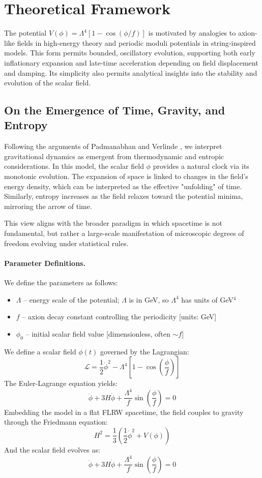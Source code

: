 \documentclass[12pt]{article}
\begin{document}
\section{Theoretical Framework}

The potential \( V(\phi) = \Lambda^4 [1 - \cos(\phi/f)] \) is motivated by analogies to axion-like fields in high-energy theory and periodic moduli potentials in string-inspired models. This form permits bounded, oscillatory evolution, supporting both early inflationary expansion and late-time acceleration depending on field displacement and damping. Its simplicity also permits analytical insights into the stability and evolution of the scalar field.

\subsection*{On the Emergence of Time, Gravity, and Entropy}

Following the arguments of Padmanabhan \cite{Padmanabhan2010} and Verlinde \cite{Verlinde2011}, we interpret gravitational dynamics as emergent from thermodynamic and entropic considerations. In this model, the scalar field $\phi$ provides a natural clock via its monotonic evolution. The expansion of space is linked to changes in the field’s energy density, which can be interpreted as the effective "unfolding" of time. Similarly, entropy increases as the field relaxes toward the potential minima, mirroring the arrow of time.

This view aligns with the broader paradigm in which spacetime is not fundamental, but rather a large-scale manifestation of microscopic degrees of freedom evolving under statistical rules.


\paragraph{Parameter Definitions.} 
We define the parameters as follows:
\begin{itemize}
  \item $\Lambda$ – energy scale of the potential; $\Lambda$ is in GeV, so $\Lambda^4$ has units of GeV$^4$
  \item $f$ – axion decay constant controlling the periodicity [units: GeV]
  \item $\phi_0$ – initial scalar field value [dimensionless, often $\sim f$]
\end{itemize}

We define a scalar field $\phi(t)$ governed by the Lagrangian:
\[
\mathcal{L} = \frac{1}{2} \dot{\phi}^2 - \Lambda^4 \left[1 - \cos\left(\frac{\phi}{f}\right)\right]
\]
The Euler-Lagrange equation yields:
\[
\ddot{\phi} + 3H\dot{\phi} + \frac{\Lambda^4}{f} \sin\left(\frac{\phi}{f}\right) = 0
\]
Embedding the model in a flat FLRW spacetime, the field couples to gravity through the Friedmann equation:
\[
H^2 = \frac{1}{3} \left( \frac{1}{2} \dot{\phi}^2 + V(\phi) \right)
\]
And the scalar field evolves as:
\[
\ddot{\phi} + 3H\dot{\phi} + \frac{\Lambda^4}{f} \sin\left(\frac{\phi}{f}\right) = 0
\]
\end{document}
